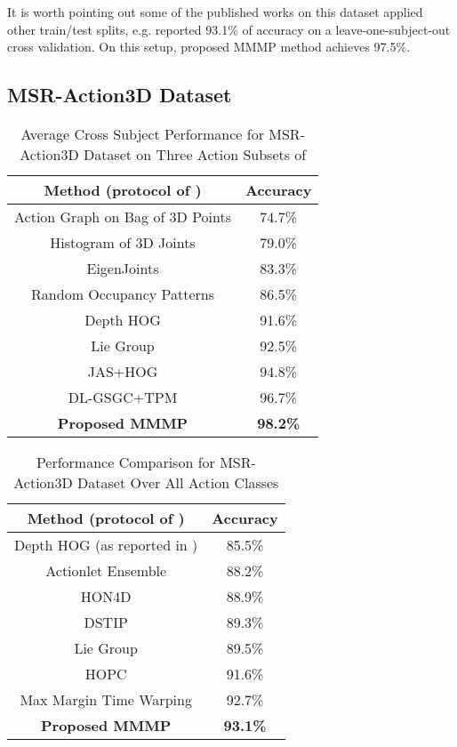 \documentclass[9pt,technote,compsoc]{IEEEtran}
\begin{document}
It is worth pointing out some of the published works on this dataset applied other train/test splits, e.g. \cite{AlthloothiPR} reported 93.1\% of accuracy on a leave-one-subject-out cross validation. On this setup, proposed MMMP method achieves 97.5\%.



\subsection{MSR-Action3D Dataset}
\begin{table}[!t]
	\renewcommand{\arraystretch}{1.3}
	\caption{Average Cross Subject Performance for MSR-Action3D Dataset on Three Action Subsets of \cite{msraction3ddataset}}
	\label{table_msraction3dT1}
	\centering
	\begin{tabular}{|c||c|}
		\hline
		\bfseries Method (protocol of \cite{msraction3ddataset}) & \bfseries Accuracy\\
		\hline
		\hline Action Graph on Bag of 3D Points \cite{msraction3ddataset} & 74.7\%\\
		\hline Histogram of 3D Joints \cite{HOJ3D} & 79.0\%\\
		\hline EigenJoints \cite{eigenjointsJournal} & 83.3\%\\
		\hline Random Occupancy Patterns \cite{wangECCV12robust} & 86.5\%\\
		\hline Depth HOG \cite{DHOG} & 91.6\%\\
		\hline Lie Group \cite{VemulapalliCVPR14} & 92.5\%\\
		\hline JAS+HOG \cite{hog2-ohnbar} & 94.8\%\\
		\hline DL-GSGC+TPM \cite{Luo_2013_ICCV} & 96.7\%\\
		\hline\hline
		{\bf Proposed MMMP} & {\bf 98.2\%}\\
		\hline
	\end{tabular}
\end{table}

\begin{table}[!t]
	\renewcommand{\arraystretch}{1.3}
	\caption{Performance Comparison for MSR-Action3D Dataset Over All Action Classes}
	\label{table_msraction3dT2}
	\centering
	\begin{tabular}{|c||c|}
		\hline
		\bfseries Method (protocol of \cite{actionletPAMI})& \bfseries Accuracy\\
		\hline
		\hline Depth HOG \cite{DHOG} (as reported in \cite{MMTW}) & 85.5\%\\
		\hline Actionlet Ensemble \cite{actionletPAMI} & 88.2\%\\
		\hline HON4D \cite{HON4D} & 88.9\%\\
		\hline DSTIP \cite{xiaCVPR13spatio} & 89.3\%\\
		\hline Lie Group \cite{VemulapalliCVPR14} & 89.5\%\\
		\hline HOPC \cite{HOPC} & 91.6\%\\
		\hline Max Margin Time Warping \cite{MMTW} & 92.7\%\\
		\hline 
		\hline
		{\bf Proposed MMMP} & {\bf 93.1\%}\\
		\hline
	\end{tabular}
\end{table}
\end{document}
